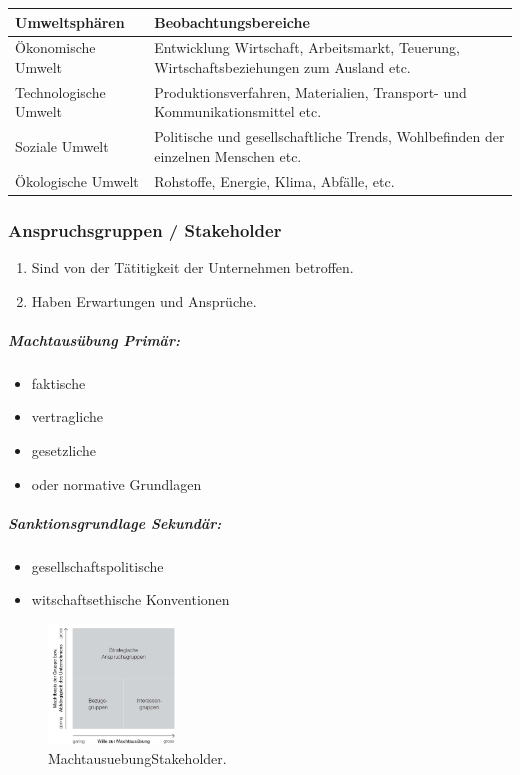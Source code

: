 \documentclass{article}
\begin{document}
\begin{tabular}{|l|l|}
\hline 
\rule[-1ex]{0pt}{2.5ex} \textbf{Umweltsphären} & \textbf{Beobachtungsbereiche} \\ 
\hline 
\rule[-1ex]{0pt}{2.5ex} Ökonomische Umwelt & Entwicklung Wirtschaft, Arbeitsmarkt, Teuerung, Wirtschaftsbeziehungen zum Ausland etc. \\ 
\hline 
\rule[-1ex]{0pt}{2.5ex} Technologische Umwelt & Produktionsverfahren, Materialien, Transport- und Kommunikationsmittel etc. \\ 
\hline 
\rule[-1ex]{0pt}{2.5ex} Soziale Umwelt & Politische und gesellschaftliche Trends, Wohlbefinden der einzelnen Menschen etc. \\ 
\hline 
\rule[-1ex]{0pt}{2.5ex} Ökologische Umwelt & Rohstoffe, Energie, Klima, Abfälle, etc. \\ 
\hline 
\end{tabular} 


\subsubsection{Anspruchsgruppen / Stakeholder}
\begin{enumerate}
\item Sind von der Tätitigkeit der Unternehmen betroffen. 
\item Haben Erwartungen und Ansprüche.
\end{enumerate}
 

\subparagraph{Machtausübung Primär:}
\begin{itemize}
\item faktische
\item vertragliche
\item gesetzliche
\item oder normative Grundlagen
\end{itemize}


\subparagraph{Sanktionsgrundlage Sekundär:}
\begin{itemize}
\item gesellschaftspolitische
\item witschaftsethische Konventionen
\end{itemize}

\begin{figure}
\centering
\includegraphics[width=0.3\textwidth]{Resources/Image/MachtausuebungStakeholder.png}
\caption{\label{fig:MachtausuebungStakeholder}MachtausuebungStakeholder.}
\end{figure}
\end{document}
